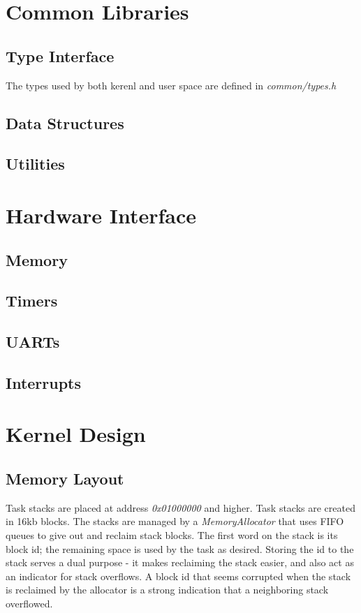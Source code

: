 \documentclass[twoside,a4paper]{refart}
\begin{document}
\section{Common Libraries}
\subsection{Type Interface}
The types used by both kerenl and user space are defined in \textit{common/types.h}
\subsection{Data Structures}
\subsection{Utilities}

\section{Hardware Interface}
\subsection{Memory}
\subsection{Timers}
\subsection{UARTs}
\subsection{Interrupts}

\section{Kernel Design}

\subsection{Memory Layout}
Task stacks are placed at address \textit{0x01000000} and higher. Task stacks are created in 16kb blocks. The stacks are managed by a \textit{MemoryAllocator} that uses FIFO queues to give out and reclaim stack blocks. The first word on the stack is its block id; the remaining space is used by the task as desired. Storing the id to the stack serves a dual purpose - it makes reclaiming the stack easier, and also act as an indicator for stack overflows. A block id that seems corrupted when the stack is reclaimed by the allocator is a strong indication that a neighboring stack overflowed. 
\end{document}
